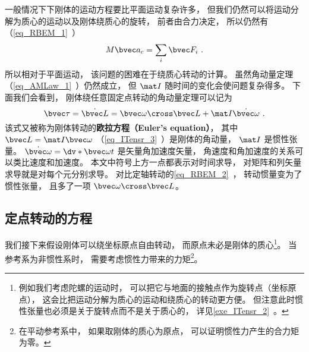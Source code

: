 

一般情况下下刚体的运动方程要比平面运动复杂许多， 但我们仍然可以将运动分解为质心的运动以及刚体绕质心的旋转， 前者由合力决定， 所以仍然有（\autoref{eq_RBEM_1}~）
\begin{equation}\label{eq_RBEqM_8}
M\bvec a_c = \sum_i \bvec F_i~.
\end{equation}
所以相对于平面运动， 该问题的困难在于绕质心转动的计算。 虽然角动量定理（\autoref{eq_AMLaw_1}~）仍然成立， 但 $\mat I$ 随时间的变化会使问题复杂得多。 下面我们会看到， 刚体绕任意固定点转动的角动量定理可以记为
\begin{equation}\label{eq_RBEqM_1}
\bvec\tau = \dot{\bvec L} = \bvec\omega \cross \bvec L + \mat I \dot{\bvec\omega}~.
\end{equation}
该式又被称为刚体转动的\textbf{欧拉方程（Euler's equation）}， 其中 $\bvec L = \mat I\bvec\omega$ （\autoref{eq_ITensr_3}~）是刚体的角动量， $\mat I$ 是惯性张量。 $\dot{\bvec\omega} = \dv*{\bvec\omega}{t}$ 是矢量角加速度矢量， 角速度和角加速度的关系可以类比速度和加速度。 本文中符号上方一点都表示对时间求导， 对矩阵和列矢量求导就是对每个元分别求导。  对比定轴转动的\autoref{eq_RBEM_2}~， 转动惯量变为了惯性张量， 且多了一项 $\bvec\omega \cross \bvec L$。

\subsection{定点转动的方程}
我们接下来假设刚体可以绕坐标原点自由转动， 而原点未必是刚体的质心\footnote{例如我们考虑陀螺的运动时， 可以把它与地面的接触点作为旋转点（坐标原点）， 这会比把运动分解为质心的运动和绕质心的转动更方便。 但注意此时惯性张量也必须是关于旋转点而不是关于质心的， 详见\autoref{exe_ITensr_2}~。}。 当参考系为非惯性系时， 需要考虑惯性力带来的力矩\footnote{在平动参考系中， 如果取刚体的质心为原点， 可以证明惯性力产生的合力矩为零。}。

